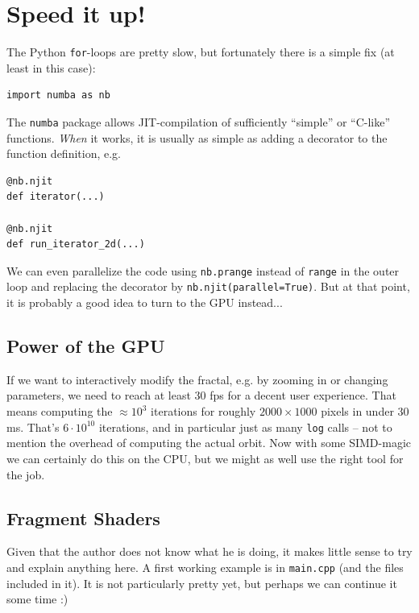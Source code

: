 \documentclass[english,landscape]{article}
\begin{document}
\newpage
\begin{minipage}[c]{0.4\linewidth}
\section{Speed it up!}
The Python \texttt{for}-loops are pretty slow, but fortunately there is a simple fix (at least in this case):
\begin{verbatim}
import numba as nb
\end{verbatim}
The \texttt{numba} package allows JIT-compilation of sufficiently \enquote{simple} or \enquote{C-like} functions.
\emph{When} it works, it is usually as simple as adding a decorator to the function definition, e.g.
\begin{verbatim}
@nb.njit
def iterator(...)

@nb.njit
def run_iterator_2d(...)
\end{verbatim}
We can even parallelize the code using \texttt{nb.prange} instead of \texttt{range} in the outer loop and replacing the decorator by \texttt{nb.njit(parallel=True)}.
But at that point, it is probably a good idea to turn to the GPU instead...
\subsection{Power of the GPU}
If we want to interactively modify the fractal, e.g. by zooming in or changing parameters, we need to reach at least $30$ fps for a decent user experience.
That means computing the $\approx 10^3$ iterations for roughly $2000 \times 1000$ pixels in under $30\,$ms.
That's $6\cdot 10^{10}$ iterations, and in particular just as many \texttt{log} calls -- not to mention the overhead of computing the actual orbit.
Now with some SIMD-magic we can certainly do this on the CPU, but we might as well use the right tool for the job.
\subsection{Fragment Shaders}
Given that the author does not know what he is doing, it makes little sense to try and explain anything here.
A first working example is in \texttt{main.cpp} (and the files included in it).
It is not particularly pretty yet, but perhaps we can continue it some time :)



\end{minipage}%
\begin{minipage}[c]{0.1\linewidth}
\,
\end{minipage}%
\begin{minipage}[c]{0.4\linewidth}
\,
\end{minipage}
\end{document}
